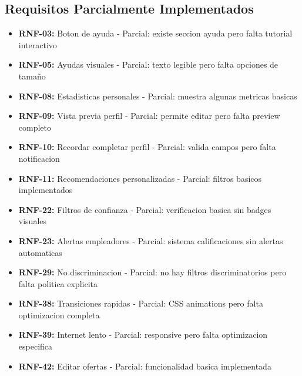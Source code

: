 \documentclass[12pt, a4paper]{article}
\begin{document}
\begin{itemize}
\subsection{Requisitos Parcialmente Implementados}
\begin{itemize}
    \item \textbf{RNF-03:} Boton de ayuda - Parcial: existe seccion ayuda pero falta tutorial interactivo
    \item \textbf{RNF-05:} Ayudas visuales - Parcial: texto legible pero falta opciones de tamaño
    \item \textbf{RNF-08:} Estadisticas personales - Parcial: muestra algunas metricas basicas
    \item \textbf{RNF-09:} Vista previa perfil - Parcial: permite editar pero falta preview completo
    \item \textbf{RNF-10:} Recordar completar perfil - Parcial: valida campos pero falta notificacion
    \item \textbf{RNF-11:} Recomendaciones personalizadas - Parcial: filtros basicos implementados
    \item \textbf{RNF-22:} Filtros de confianza - Parcial: verificacion basica sin badges visuales
    \item \textbf{RNF-23:} Alertas empleadores - Parcial: sistema calificaciones sin alertas automaticas
    \item \textbf{RNF-29:} No discriminacion - Parcial: no hay filtros discriminatorios pero falta politica explicita
    \item \textbf{RNF-38:} Transiciones rapidas - Parcial: CSS animations pero falta optimizacion completa
    \item \textbf{RNF-39:} Internet lento - Parcial: responsive pero falta optimizacion especifica
    \item \textbf{RNF-42:} Editar ofertas - Parcial: funcionalidad basica implementada
\end{itemize}


\end{itemize}
\end{document}
